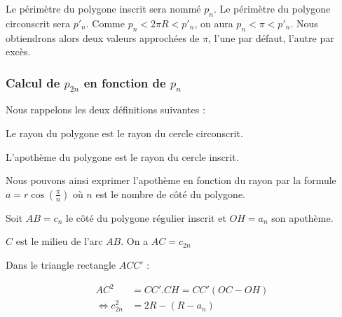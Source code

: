 Le périmètre du polygone inscrit sera nommé $p_n$. Le périmètre du polygone circonscrit
sera $p'_n$. Comme $p_n < 2\pi R < p'_n$, on aura $p_n < \pi < p'_n$.
Nous obtiendrons alors deux valeurs approchées de $\pi$, l'une par défaut, l'autre par excès.

\subsubsection{Calcul de $p_{2n}$ en fonction de $p_n$}

Nous rappelons les deux définitions suivantes :
\begin{definition}
	Le rayon du polygone est le rayon du cercle circonscrit. 
\end{definition}

\begin{definition}
	L'apothème du polygone est le rayon du cercle inscrit. 
\end{definition}
Nous pouvons ainsi exprimer l'apothème en fonction du rayon par la formule $a = r \cos (\frac{\pi}{n}) $ où
$n$ est le nombre de côté du polygone.


Soit $AB = c_n$ le côté du polygone régulier inscrit et $OH=a_n$ son apothème. 

$C$ est le milieu de l'arc $AB$. On a $AC=c_{2n}$ 


\begin{figure}[H]
	\centering
	\end{figure}

Dans le triangle rectangle $ACC'$ : 

\begin{align*}
AC^2 &= CC'.CH = CC' (OC - OH) \\
\Leftrightarrow  c_{2n}^2 &= 2R -(R-a_n)
\end{align*}


